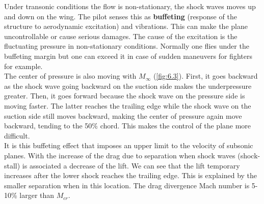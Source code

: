 	Under transonic conditions the flow is non-stationary, the shock waves moves up and down on the wing. The pilot senses this as \textbf{buffeting} (response of the structure to aerodynamic excitation) and vibrations. This can make the plane uncontrollable or cause serious damages. The cause of the excitation is the fluctuating pressure in non-stationary conditions. Normally one flies under the buffeting margin but one can exceed it in case of sudden maneuvers for fighters for example. \\
	
	The center of pressure is also moving with $M_\infty$ (\autoref{fig:6.3}). First, it goes backward as the shock wave going backward on the suction side makes the underpressure greater. Then, it goes forward because the shock wave on the pressure side is moving faster. The latter reaches the trailing edge while the shock wave on the suction side still moves backward, making the center of pressure again move backward, tending to the 50\% chord. This makes the control of the plane more difficult. \\
	
	It is this buffeting effect that imposes an upper limit to the velocity of subsonic planes. With the increase of the drag due to separation when shock waves (shock-stall) is associated a decrease of the lift. We can see that the lift temporary increases after the lower shock reaches the trailing edge. This is explained by the smaller separation when in this location. The drag divergence Mach number is 5-10\% larger than $M_{cr}$. 
	
	\ \\
	
